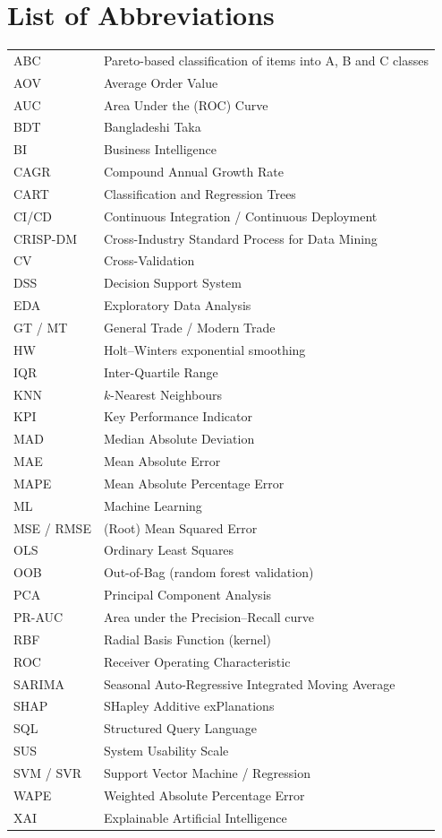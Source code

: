\chapter*{List of Abbreviations}
\begin{tabular}{@{}ll@{}}
ABC    & Pareto-based classification of items into A, B and C classes \\
AOV    & Average Order Value \\
AUC    & Area Under the (ROC) Curve \\
BDT    & Bangladeshi Taka \\
BI     & Business Intelligence \\
CAGR   & Compound Annual Growth Rate \\
CART   & Classification and Regression Trees \\
CI/CD  & Continuous Integration / Continuous Deployment \\
CRISP-DM & Cross-Industry Standard Process for Data Mining \\
CV     & Cross-Validation \\
DSS    & Decision Support System \\
EDA    & Exploratory Data Analysis \\
GT / MT & General Trade / Modern Trade \\
HW     & Holt--Winters exponential smoothing \\
IQR    & Inter-Quartile Range \\
KNN    & $k$-Nearest Neighbours \\
KPI    & Key Performance Indicator \\
MAD    & Median Absolute Deviation \\
MAE    & Mean Absolute Error \\
MAPE   & Mean Absolute Percentage Error \\
ML     & Machine Learning \\
MSE / RMSE & (Root) Mean Squared Error \\
OLS    & Ordinary Least Squares \\
OOB    & Out-of-Bag (random forest validation) \\
PCA    & Principal Component Analysis \\
PR-AUC & Area under the Precision--Recall curve \\
RBF    & Radial Basis Function (kernel) \\
ROC    & Receiver Operating Characteristic \\
SARIMA & Seasonal Auto-Regressive Integrated Moving Average \\
SHAP   & SHapley Additive exPlanations \\
SQL    & Structured Query Language \\
SUS    & System Usability Scale \\
SVM / SVR & Support Vector Machine / Regression \\
WAPE   & Weighted Absolute Percentage Error \\
XAI    & Explainable Artificial Intelligence \\
\end{tabular}
